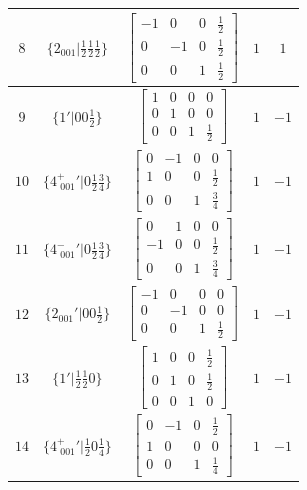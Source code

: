 \documentclass[fleqn,8pt]{jsarticle}
\begin{document}
\begin{longtable}{ccccc}
$ 8 $ & $ \{2{}_{001}|\frac{1}{2} \frac{1}{2} \frac{1}{2}\} $ & $ \begin{bmatrix} -1 & 0 & 0 & \frac{1}{2} \\ 0 & -1 & 0 & \frac{1}{2} \\ 0 & 0 & 1 & \frac{1}{2} \end{bmatrix} $ & $ 1 $ & $ 1 $ \\ \hline
$ 9 $ & $ \{1{}'|0 0 \frac{1}{2}\} $ & $ \begin{bmatrix} 1 & 0 & 0 & 0 \\ 0 & 1 & 0 & 0 \\ 0 & 0 & 1 & \frac{1}{2} \end{bmatrix} $ & $ 1 $ & $ -1 $ \\ \hline
$ 10 $ & $ \{4^{+}_{\,\,001}{}'|0 \frac{1}{2} \frac{3}{4}\} $ & $ \begin{bmatrix} 0 & -1 & 0 & 0 \\ 1 & 0 & 0 & \frac{1}{2} \\ 0 & 0 & 1 & \frac{3}{4} \end{bmatrix} $ & $ 1 $ & $ -1 $ \\ \hline
$ 11 $ & $ \{4^{-}_{\,\,001}{}'|0 \frac{1}{2} \frac{3}{4}\} $ & $ \begin{bmatrix} 0 & 1 & 0 & 0 \\ -1 & 0 & 0 & \frac{1}{2} \\ 0 & 0 & 1 & \frac{3}{4} \end{bmatrix} $ & $ 1 $ & $ -1 $ \\ \hline
$ 12 $ & $ \{2{}_{001}{}'|0 0 \frac{1}{2}\} $ & $ \begin{bmatrix} -1 & 0 & 0 & 0 \\ 0 & -1 & 0 & 0 \\ 0 & 0 & 1 & \frac{1}{2} \end{bmatrix} $ & $ 1 $ & $ -1 $ \\ \hline
$ 13 $ & $ \{1{}'|\frac{1}{2} \frac{1}{2} 0\} $ & $ \begin{bmatrix} 1 & 0 & 0 & \frac{1}{2} \\ 0 & 1 & 0 & \frac{1}{2} \\ 0 & 0 & 1 & 0 \end{bmatrix} $ & $ 1 $ & $ -1 $ \\ \hline
$ 14 $ & $ \{4^{+}_{\,\,001}{}'|\frac{1}{2} 0 \frac{1}{4}\} $ & $ \begin{bmatrix} 0 & -1 & 0 & \frac{1}{2} \\ 1 & 0 & 0 & 0 \\ 0 & 0 & 1 & \frac{1}{4} \end{bmatrix} $ & $ 1 $ & $ -1 $ \\ \hline

\end{longtable}
\end{document}
